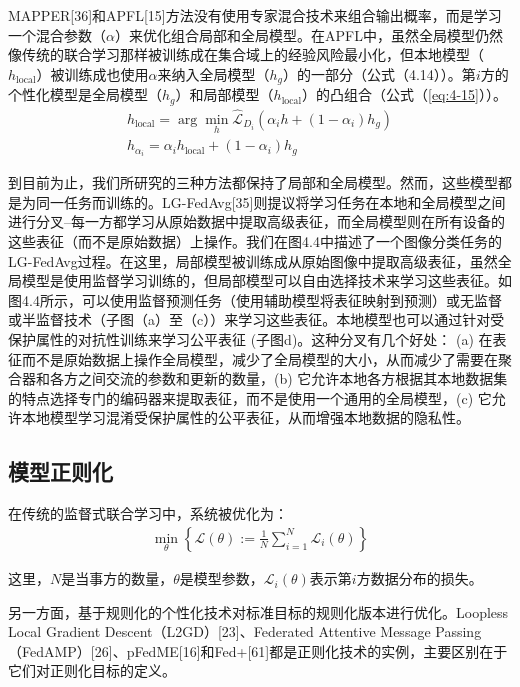 MAPPER[36]和APFL[15]方法没有使用专家混合技术来组合输出概率，而是学习一个混合参数（$\alpha$）来优化组合局部和全局模型。在APFL中，虽然全局模型仍然像传统的联合学习那样被训练成在集合域上的经验风险最小化，但本地模型（$h_{\text{local}}$）被训练成也使用$\alpha$来纳入全局模型（$h_{g}$）的一部分（公式（4.14））。第$i$方的个性化模型是全局模型（$h_{g}$）和局部模型（$h_{\text{local}}$）的凸组合（公式（\ref{eq:4-15}））。
\begin{align}
	h_{\text{local}} = \arg \min_{h} \hat{\mathcal{L}}_{D_{i}} (\alpha_{i}h + (1-\alpha_{i})h_{g})	\label{eq:4-14} \\
	h_{\alpha_{i}} = \alpha_{i}h_{\text{local}} + (1 - \alpha_{i})h_{g}	\label{eq:4-15}
\end{align}

到目前为止，我们所研究的三种方法都保持了局部和全局模型。然而，这些模型都是为同一任务而训练的。LG-FedAvg[35]则提议将学习任务在本地和全局模型之间进行分叉--每一方都学习从原始数据中提取高级表征，而全局模型则在所有设备的这些表征（而不是原始数据）上操作。我们在图4.4中描述了一个图像分类任务的LG-FedAvg过程。在这里，局部模型被训练成从原始图像中提取高级表征，虽然全局模型是使用监督学习训练的，但局部模型可以自由选择技术来学习这些表征。如图4.4所示，可以使用监督预测任务（使用辅助模型将表征映射到预测）或无监督或半监督技术（子图（a）至（c））来学习这些表征。本地模型也可以通过针对受保护属性的对抗性训练来学习公平表征  (子图d)。这种分叉有几个好处： (a) 在表征而不是原始数据上操作全局模型，减少了全局模型的大小，从而减少了需要在聚合器和各方之间交流的参数和更新的数量，(b) 它允许本地各方根据其本地数据集的特点选择专门的编码器来提取表征，而不是使用一个通用的全局模型，(c) 它允许本地模型学习混淆受保护属性的公平表征，从而增强本地数据的隐私性。

\subsection{模型正则化}
在传统的监督式联合学习中，系统被优化为：
\begin{align}
	\min_{\theta} \left\{ \mathcal{L}(\theta) := \frac{1}{N} \sum_{i=1}^{N} \mathcal{L}_{i}(\theta) \right\} \label{eq:4-16}
\end{align}

这里，$N$是当事方的数量，$\theta$是模型参数，$\mathcal{L}_{i}(\theta)$表示第$i$方数据分布的损失。

另一方面，基于规则化的个性化技术对标准目标的规则化版本进行优化。Loopless Local Gradient Descent（L2GD）[23]、Federated Attentive Message Passing（FedAMP）[26]、pFedME[16]和Fed+[61]都是正则化技术的实例，主要区别在于它们对正则化目标的定义。

